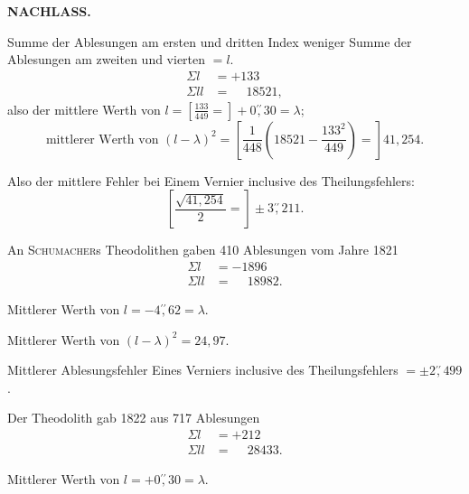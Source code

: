 \par\clearpage
\noindent{}\hfill{\small\textbf{NACHLASS.}}\hfill\null\par\medskip
\par\noindent\hspace*{\parindent}Summe der Ablesungen am ersten und dritten Index weniger Summe der Ablesungen am zweiten und vierten $=l$.
\[
\begin{aligned}
\Sigma l&=+133\\
\Sigma ll&=\phantom{+}18521,
\end{aligned}
\]
\noindent also der mittlere Werth von $l=\left[\frac{133}{449}=\right]+0\overset{\prime\prime}{,}30=\lambda$;
\[
\text{mittlerer Werth von }(l-\lambda)^2=
\left[\frac{1}{448}\left(18521-\frac{133^2}{449}\right)=\right]41{,}254.
\]
\par\noindent\hspace*{\parindent}Also der mittlere Fehler bei Einem Vernier inclusive des Theilungsfehlers:
\[
\left[\frac{\sqrt{41{,}254}}{2}=\right]\pm3\overset{\prime\prime}{,}211.
\]
\par\noindent\hspace*{\parindent}An \textsc{Schumacher}s Theodolithen gaben 410 Ablesungen vom Jahre 1821
\[
\begin{aligned}
\Sigma l&=-1896\\
\Sigma ll&=\phantom{-}18982.
\end{aligned}
\]
\par\noindent\hspace*{\parindent}Mittlerer Werth von $l=-4\overset{\prime\prime}{,}62=\lambda$.
\par\noindent\hspace*{\parindent}Mittlerer Werth von $(l-\lambda)^2=24{,}97$.
\par\noindent\hspace*{\parindent}Mittlerer Ablesungsfehler Eines Verniers inclusive des Theilungsfehlers $=\pm2\overset{\prime\prime}{,}499$.
\par\bigskip\bigskip
\par\noindent\hspace*{\parindent}Der Theodolith gab 1822 aus 717 Ablesungen
\[
\begin{aligned}
\Sigma l&=+212\\
\Sigma ll&=\phantom{+}28433.
\end{aligned}
\]
\par\noindent\hspace*{\parindent}Mittlerer Werth von $l=+0\overset{\prime\prime}{,}30=\lambda$.
